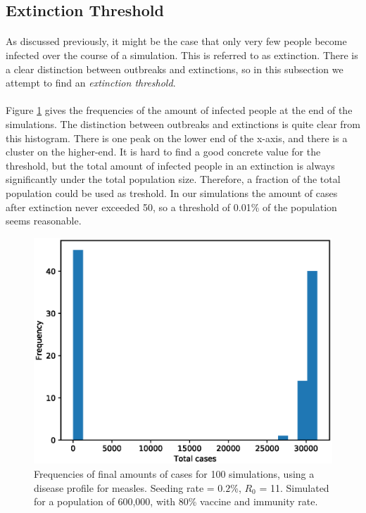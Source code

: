 \documentclass[runningheads]{llncs}
\begin{document}
\subsection{Extinction Threshold}

\paragraph{} As discussed previously, it might be the case that only very few people become infected over the course of a simulation. This is referred to as extinction. There is a clear distinction between outbreaks and extinctions, so in this subsection we attempt to find an \emph{extinction threshold}.

\paragraph{} Figure \ref{ETHist} gives the frequencies of the amount of infected people at the end of the simulations. The distinction between outbreaks and extinctions is quite clear from this histogram. There is one peak on the lower end of the x-axis, and there is a cluster on the higher-end. It is hard to find a good concrete value for the threshold, but the total amount of infected people in an extinction is always significantly under the total population size. Therefore, a fraction of the total population could be used as treshold. In our simulations the amount of cases after extinction never exceeded 50, so a threshold of 0.01\% of the population seems reasonable.

\begin{figure}[!h]
	\centering
	\includegraphics[width=\textwidth]{Hist.eps}
	\caption{Frequencies of final amounts of cases for 100 simulations, using a disease profile for measles. Seeding rate = $0.2$\%, $R_0$ = 11. Simulated for a population of 600,000, with 80\% vaccine and immunity rate.} 
	\label{ETHist}
\end{figure}
\end{document}
